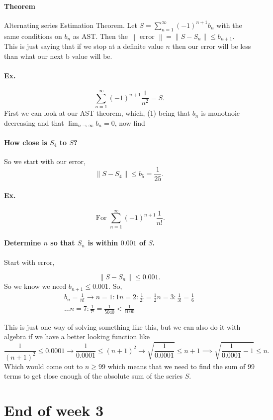 \paragraph{Theorem} Alternating series Estimation Theorem. Let $ S=\sum_{ n=1 } ^{ \infty } \left( -1 \right) ^{ n+1 }b_n $ with the same conditions on $ b_n $ as AST. Then the $ \left\| \text{ error } \right\|=\left\| S-S_n \right\| \le b_{ n+1 } $. \\
\label{par:Theorem}
This is just saying that if we stop at a definite value $ n $ then our error will be less than what our next b value will be. 

\paragraph{Ex.}
\[
\sum_{ n=1 } ^{ \infty } \left( -1 \right) ^{ n+1 }\frac{ 1 }{ n^2 } =S
.\] 
First we can look at our AST theorem, which, (1) being that $ b_n $ is monotnoic decreasing and that $ \lim_{ n \to \infty} b_n = 0 $, now find 
\paragraph{How close is $ S_4 $ to $ S $?\\}
So we start with our error, 
\[
\left\| S-S_{ 4 } \right\|\le b_5 = \frac{ 1 }{ 25 } 
.\] 

\paragraph{Ex.}
\[
\text{ For }\sum_{ n=1 } ^{ \infty } \left( -1 \right) ^{ n+1 }\frac{ 1 }{ n! } 
.\] 
\paragraph{Determine $ n $ so that $ S_n $ is within $ 0.001 $ of $ S $.\\}

Start with error, 

\[
\left\| S-S_n \right\|\le 0.001
.\] 
So we know we need $ b_{ n+1 }\le 0.001 $. So,
\begin{gather*}
b_n = \frac{ 1 }{ n! } \to n=1:1 n=2:\frac{ 1 }{ 2! } =\frac{ 1 }{ 2 } n=3:\frac{ 1 }{ 3! } =\frac{ 1 }{ 6 } \\
\ldots n=7:\frac{ 1 }{ 7! } =\frac{ 1 }{ 5040 } <\frac{ 1 }{ 1000 } 
\end{gather*}

This is just one way of solving something like this, but we can also do it with algebra if we have a better looking function like
\[
\frac{ 1 }{ \left( n+1 \right) ^2 } \le 0.0001 \to \frac{ 1 }{ 0.0001 } \le \left( n+1 \right) ^2 \to \sqrt{ \frac{ 1 }{ 0.0001 } }\le n+1 \implies \sqrt{ \frac{ 1 }{ 0.0001 } -1}\le n
.\] 
Which would come out to $ n\ge 99 $ which means that we need to find the sum of 99 terms to get close enough of the absolute sum of the series $ S $. 

\section{End of week 3}%
\label{sec:End of week 3}

